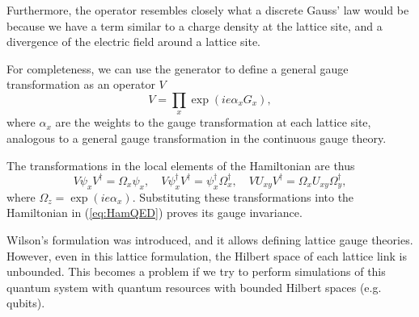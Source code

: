 \documentclass[a4paper]{report}
\begin{document}
\begin{spacing}{1.1}
Furthermore, the operator resembles closely what a discrete Gauss' law would be because we have a term similar to a charge density at the lattice site, and a divergence of the electric field around a lattice site.

For completeness, we can use the generator to define a general gauge transformation as an operator $V$
\begin{equation}
    V = \prod_x \exp(i e \alpha_x G_x),
\end{equation}
where $\alpha_x$ are the weights to the gauge transformation at each lattice site, analogous to a general gauge transformation in the continuous gauge theory.

The transformations in the local elements of the Hamiltonian are thus
\begin{equation}
    V\psi_x V^\dagger = \Omega_x \psi_x, \quad V \psi^\dagger_x V^\dagger = \psi^\dagger_x \Omega^\dagger_{x}, \quad V U_{xy} V^\dagger = \Omega_{x} U_{xy} \Omega^\dagger_{y},
\end{equation}
where $\Omega_z = \exp(ie\alpha_x)$. Substituting these transformations into the Hamiltonian in (\ref{eq:HamQED}) proves its gauge invariance.




Wilson's formulation was introduced, and it allows defining lattice gauge theories. However, even in this lattice formulation, the Hilbert space of each lattice link is unbounded. This becomes a problem if we try to perform simulations of this quantum system with quantum resources with bounded Hilbert spaces (e.g. qubits).


\end{spacing}
\end{document}
